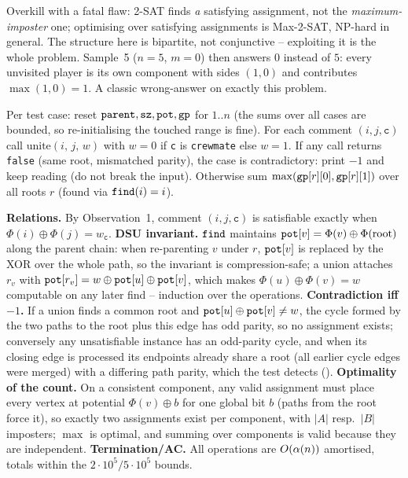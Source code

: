 \begin{thinkbox}
{Overkill with a fatal flaw: 2-SAT finds \emph{a} satisfying assignment, not
the \emph{maximum-imposter} one; optimising over satisfying assignments is
Max-2-SAT, NP-hard in general.  The structure here is bipartite, not
conjunctive -- exploiting it is the whole problem.}
{Sample~5 (\(n=5\), \(m=0\)) then answers \(0\) instead of \(5\): every
unvisited player is its own component with sides \((1,0)\) and contributes
\(\max(1,0)=1\).  A classic wrong-answer on exactly this problem.}
\end{thinkbox}

Per test case: reset \(\texttt{parent},\texttt{sz},\texttt{pot},\texttt{gp}\) for
\(1..n\) (the sums over all cases are bounded, so re-initialising the touched
range is fine).  For each comment \((i,j,\texttt{c})\) call
\(\text{unite}(i,\,j,\,w)\) with \(w=0\) if \texttt{c} is \texttt{crewmate}
else \(w=1\).  If any call returns \texttt{false} (same root, mismatched
parity), the case is contradictory: print \(-1\) and keep reading (do not
break the input).  Otherwise sum \(\max(\texttt{gp}[r][0],\texttt{gp}[r][1])\)
over all roots \(r\) (found via \(\texttt{find}(i)=i\)).

\begin{proofbox}
\textbf{Relations.} By Observation~1, comment \((i,j,\texttt{c})\) is
satisfiable exactly when \(\Phi(i)\oplus\Phi(j)=w_{\texttt{c}}\).
\textbf{DSU invariant.} \(\texttt{find}\) maintains
\(\texttt{pot}[v]=\Phi(v)\oplus\Phi(\text{root})\) along the parent chain: when
re-parenting \(v\) under \(r\), \(\texttt{pot}[v]\) is replaced by the XOR over
the whole path, so the invariant is compression-safe; a union attaches
\(r_v\) with \(\texttt{pot}[r_v]=w\oplus\texttt{pot}[u]\oplus\texttt{pot}[v]\),
which makes \(\Phi(u)\oplus\Phi(v)=w\) computable on any later find --
induction over the operations.
\textbf{Contradiction iff \(-1\).} If a union finds a common root and
\(\texttt{pot}[u]\oplus\texttt{pot}[v]\neq w\), the cycle formed by the two paths
to the root plus this edge has odd parity, so no assignment exists; conversely
any unsatisfiable instance has an odd-parity cycle, and when its closing edge
is processed its endpoints already share a root (all earlier cycle edges were
merged) with a differing path parity, which the test detects
().
\textbf{Optimality of the count.} On a consistent component, any valid
assignment must place every vertex at potential \(\Phi(v)\oplus b\) for one
global bit \(b\) (paths from the root force it), so exactly two assignments
exist per component, with \(|A|\) resp.\ \(|B|\) imposters; \(\max\) is
optimal, and summing over components is valid because they are independent.
\textbf{Termination/AC.} All operations are \(O(\alpha(n))\) amortised,
totals within the \(2\cdot10^5 / 5\cdot10^5\) bounds.
\end{proofbox}

